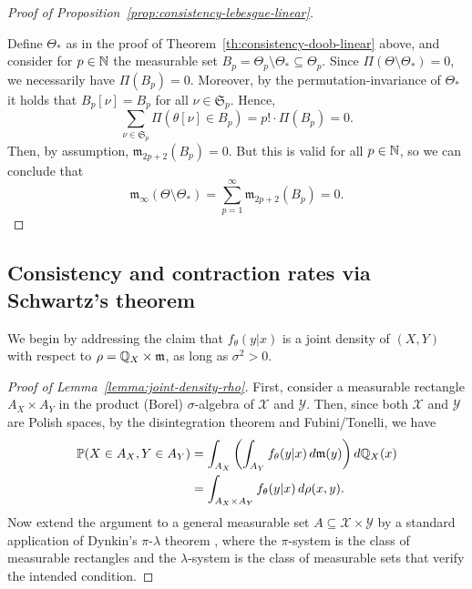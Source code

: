 \begin{proof}[Proof of Proposition~\ref{prop:consistency-lebesgue-linear}]\label{proof:consistency-lebesgue-linear}
  
Define \(\Theta_*\) as in the proof of Theorem~\ref{th:consistency-doob-linear} above, and consider for \(p\in\mathbb{N}\) the measurable set \(B_p=\Theta_p \setminus \Theta_*\subseteq \Theta_p\). Since \(\Pi(\Theta \setminus \Theta_*)=0\), we necessarily have \(\Pi(B_p)=0\). Moreover, by the permutation-invariance of \(\Theta_*\) it holds that \(B_p[\nu] = B_p\) for all \(\nu \in \mathfrak{S}_p\). Hence,
\[
\sum_{\nu\in \mathfrak{S}_p} \Pi(\theta[\nu] \in B_p) = p! \cdot \Pi(B_p) = 0.
\]
Then, by assumption, \(\mathfrak{m}_{2p+2}(B_p)=0\). But this is valid for all \(p\in\mathbb{N}\), so we can conclude that 
\[
\mathfrak{m}_\infty(\Theta\setminus \Theta_*) = \sum_{p=1}^\infty \mathfrak{m}_{2p+2}(B_p)=0.
\]
\end{proof}

\subsection{Consistency and contraction rates via Schwartz's theorem}

We begin by addressing the claim that \(f_\theta(y|x)\) is a joint density of \((X,Y)\) with respect to \(\rho=\mathbb{Q}_X\times \mathfrak{m}\), as long as \(\sigma^2>0\).

\begin{proof}[Proof of Lemma~\ref{lemma:joint-density-rho}]\label{proof:joint-density-rho}
First, consider a measurable rectangle \(A_X\times A_Y\) in the product (Borel) \(\sigma\)-algebra of \(\mathcal X\) and \(\mathcal Y\). Then, since both \(\mathcal X\) and \(\mathcal Y\) are Polish spaces, by the disintegration theorem \citep[e.g.][\S10.6]{bogachev2007measure} and Fubini/Tonelli, we have
\begin{align*}
  \mathbb{P}(X\in A_X, Y\in A_Y) &= \int_{A_X} \left(\int_{A_Y} f_\theta(y|x)\, d\mathfrak{m}(y)\right) d\mathbb{Q}_X(x)\\
  &= \int_{A_X\times A_Y} f_\theta(y|x)\, d\rho(x, y).
\end{align*}
Now extend the argument to a general measurable set \(A\subseteq \mathcal X \times \mathcal Y\) by a standard application of Dynkin's \(\pi\)-\(\lambda\) theorem \citep[Lemma~4.11]{aliprantis2006infinite}, where the \(\pi\)-system is the class of measurable rectangles and the \(\lambda\)-system is the class of measurable sets that verify the intended condition.
\end{proof}

